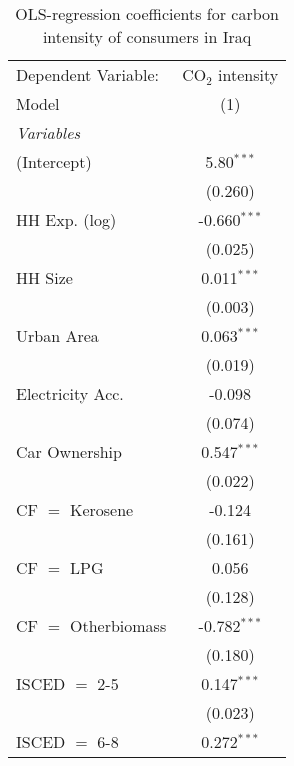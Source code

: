 
\begin{table}[htbp!]
   \centering
   \small
   \begin{adjustbox}{width = 1\textwidth, max height = 0.95\textheight, center}
      \begin{threeparttable}[b]
         \caption{\label{tab:OLS_1_IRQ} OLS-regression coefficients for carbon intensity of consumers in Iraq}
         \begin{tabular}{lc}
            \tabularnewline \midrule \midrule
            Dependent Variable: & CO$_{2}$ intensity\\  
            Model               & (1)\\  
            \midrule
            \emph{Variables}\\
            (Intercept)         & 5.80$^{***}$\\   
                                & (0.260)\\   
            HH Exp. (log)       & -0.660$^{***}$\\   
                                & (0.025)\\   
            HH Size             & 0.011$^{***}$\\   
                                & (0.003)\\   
            Urban Area          & 0.063$^{***}$\\   
                                & (0.019)\\   
            Electricity Acc.    & -0.098\\   
                                & (0.074)\\   
            Car Ownership       & 0.547$^{***}$\\   
                                & (0.022)\\   
            CF $=$ Kerosene     & -0.124\\   
                                & (0.161)\\   
            CF $=$ LPG          & 0.056\\   
                                & (0.128)\\   
            CF $=$ Otherbiomass & -0.782$^{***}$\\   
                                & (0.180)\\   
            ISCED $=$ 2-5       & 0.147$^{***}$\\   
                                & (0.023)\\   
            ISCED $=$ 6-8       & 0.272$^{***}$\\   

\end{tabular}
\end{threeparttable}
\end{adjustbox}
\end{table}
